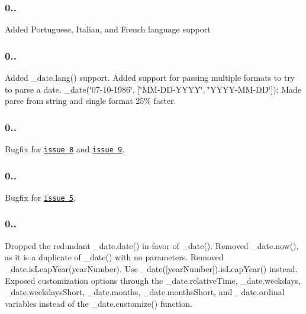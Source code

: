 \subsubsection*{0..}

Added Portuguese, Italian, and French language support

\subsubsection*{0..}

Added \+\_\+date.\+lang() support. Added support for passing multiple formats to try to parse a date. \+\_\+date(\char`\"{}07-\/10-\/1986\char`\"{}, \mbox{[}\char`\"{}\+M\+M-\/\+D\+D-\/\+Y\+Y\+Y\+Y\char`\"{}, \char`\"{}\+Y\+Y\+Y\+Y-\/\+M\+M-\/\+D\+D\char`\"{}\mbox{]}); Made parse from string and single format 25\% faster.

\subsubsection*{0..}

Bugfix for \href{https://github.com/timrwood/underscore.date/pull/8}{\tt issue 8} and \href{https://github.com/timrwood/underscore.date/pull/9}{\tt issue 9}.

\subsubsection*{0..}

Bugfix for \href{https://github.com/timrwood/underscore.date/pull/5}{\tt issue 5}.

\subsubsection*{0..}

Dropped the redundant {\ttfamily \+\_\+date.\+date()} in favor of {\ttfamily \+\_\+date()}. Removed {\ttfamily \+\_\+date.\+now()}, as it is a duplicate of {\ttfamily \+\_\+date()} with no parameters. Removed {\ttfamily \+\_\+date.\+is\+Leap\+Year(year\+Number)}. Use {\ttfamily \+\_\+date(\mbox{[}year\+Number\mbox{]}).is\+Leap\+Year()} instead. Exposed customization options through the {\ttfamily \+\_\+date.\+relative\+Time}, {\ttfamily \+\_\+date.\+weekdays}, {\ttfamily \+\_\+date.\+weekdays\+Short}, {\ttfamily \+\_\+date.\+months}, {\ttfamily \+\_\+date.\+months\+Short}, and {\ttfamily \+\_\+date.\+ordinal} variables instead of the {\ttfamily \+\_\+date.\+customize()} function.

